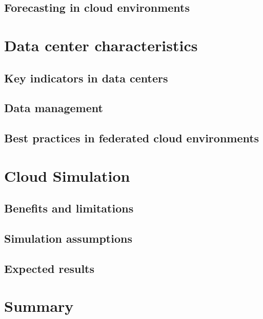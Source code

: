 \subsection{Forecasting in cloud environments}



\section{Data center characteristics}

\subsection{Key indicators in data centers}

\subsection{Data management}

\subsection{Best practices in federated cloud environments}



\section{Cloud Simulation}

\subsection{Benefits and limitations}

\subsection{Simulation assumptions}

\subsection{Expected results}



\section{Summary}



